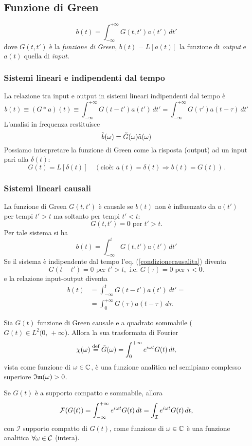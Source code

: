 \subsection*{Funzione di Green}
\[
    b(t)=\int_{-\infty}^{+\infty}G(t,t')a(t')\,dt'
\]
dove $G(t,t')$ è la \textit{funzione di Green}, $b(t)=L[a(t)]$ la funzione di \textit{output} e $a(t)$ quella di \textit{input}.
\subsubsection*{Sistemi lineari e indipendenti dal tempo}
La relazione tra input e output in sistemi lineari indipendenti dal tempo è
\[
    b(t)\equiv(G*a)(t)\equiv\int_{-\infty}^{+\infty}G(t-t')a(t')\,dt' = \int_{-\infty}^{+\infty}G(\tau')a(t-\tau)\,dt'
\]
L'analisi in frequenza restituisce
\[
    \Tilde{b}(\omega) = \Tilde{G}(\omega)\Tilde{a}(\omega)
\]
Possiamo interpretare la funzione di Green come la risposta (output) ad un input pari alla $\delta(t)$:
\[
    G(t) = L[\delta(t)]\quad (\text{cioè: }a(t)=\delta(t) \Rightarrow b(t) = G(t)).
\]  
\subsubsection*{Sistemi lineari causali}
La funzione di Green $G(t,t')$ è causale se $b(t)$ non è influenzato da $a(t')$ per tempi $t'>t$ ma soltanto per tempi $t'<t$:
\begin{equation}
    G(t,t')=0 \text{ per }t'>t.
    \label{condizionecausalita}
\end{equation}
Per tale sistema si ha
\[
    b(t) = \int_{-\infty}^{t}G(t,t')a(t')\, dt'
\]
Se il sistema è indipendente dal tempo l'eq. (\ref{condizionecausalita}) diventa
\[
    G(t-t')=0\text{ per }t'>t,\text{ i.e. }G(\tau)=0\text{ per }\tau<0.
\]
e la relazione input-output diventa
\begin{align*}
        b(t) &= \int_{-\infty}^{t}G(t-t')a(t')\, dt'=  \\
        &=\int_{0}^{+\infty}G(\tau)a(t-\tau)\,d\tau.
\end{align*}
\begin{theorem}
    Sia $G(t)$ funzione di Green causale e a quadrato sommabile ($G(t)\in L^2(0,\,+\infty$). Allora la sua trasformata di Fourier
    \[
        \chi(\omega)\stackrel{\text{def}}{=}\Tilde{G}(\omega)=\int_{0}^{+\infty}e^{i\omega t}G(t)\,dt,
    \]
    vista come funzione di $\omega \in \mathbb{C}$, è una funzione analitica nel semipiano complesso superiore $\mathfrak{Im}( \omega) > 0$.
\end{theorem}
\begin{theorem}
    Se $G(t)$ è a supporto compatto e sommabile, allora 
    \[
        \mathcal{F}(G(t)) = \int_{-\infty}^{+\infty}e^{i\omega t}G(t)\,dt = \int_{\mathcal{I}} e^{i\omega t}G(t)\,dt,
    \]
    con $\mathcal{I}$ supporto compatto di $G(t)$, come funzione di $\omega \in \mathbb{C}$ è una funzione analitica $\forall\omega\in\mathcal{C}$ (intera).
\end{theorem}
